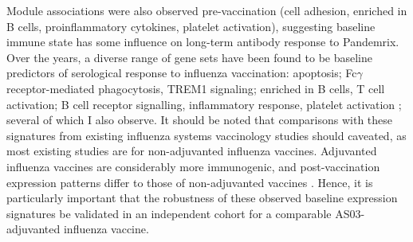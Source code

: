 Module associations were also observed pre-vaccination (cell adhesion, enriched in B cells, proinflammatory cytokines, platelet activation), suggesting baseline immune state has some influence on long-term antibody response to Pandemrix.
%
%
Over the years, a diverse range of gene sets have been found to be baseline predictors of serological response to influenza vaccination:
    apoptosis\autocite{furman2013ApoptosisOtherImmune}; 
    Fc$\gamma$ receptor-mediated phagocytosis, TREM1 signaling\autocite{tsang2014GlobalAnalysesHuman};
    enriched in B cells, T cell activation\autocite{nakaya2015SystemsAnalysisImmunity};
    B cell receptor signalling, inflammatory response, platelet activation \autocite{hipc-chisignaturesprojectteam2017MulticohortAnalysisReveals}; 
several of which I also observe.
It should be noted that comparisons with these signatures from existing influenza systems vaccinology studies should caveated, as most existing studies are for non-adjuvanted influenza vaccines.
Adjuvanted influenza vaccines are considerably more immunogenic, and post-vaccination expression patterns differ to those of non-adjuvanted vaccines \autocite{sobolev2016AdjuvantedInfluenzaH1N1Vaccination,wilkins2017AS03MF59AdjuvantedInfluenza}.
Hence, it is particularly important that the robustness of these observed baseline expression signatures be validated in an independent cohort for a comparable AS03-adjuvanted influenza vaccine.

